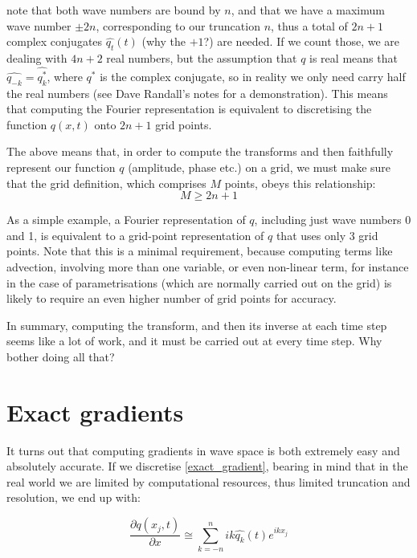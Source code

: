 note that both wave numbers are bound by $n$, and that we have a maximum wave number $\pm 2n$, corresponding to our truncation $n$, thus a total of $2n+1$ complex conjugates $\widehat{q_t}(t)$ (why the $+1$?) are needed. If we count those, we are dealing with $4n+2$ real numbers, but the assumption that $q$ is real means that $\widehat{q_{-k}}=\widehat{q_k^*}$, where $q^*$ is the complex conjugate, so in reality we only need carry half the real numbers (see Dave Randall's notes for a demonstration). This means that computing the Fourier representation is equivalent to discretising the function $q(x,t)$ onto $2n+1$ grid points.

\begin{definition}
The above means that, in order to compute the transforms and then faithfully represent our function $q$ (amplitude, phase etc.) on a grid, we must make sure that the grid definition, which comprises $M$ points, obeys this relationship:
\begin{equation}
	M \ge 2n+1
\end{equation}
\end{definition}

As a simple example, a Fourier representation of $q$, including just wave numbers 0 and 1, is equivalent to a grid-point representation of $q$ that uses only 3 grid points. Note that this is a minimal requirement, because computing terms like advection, involving more than one variable, or even non-linear term, for instance in the case of parametrisations (which are normally carried out on the grid) is likely to require an even higher number of grid points for accuracy.

In summary, computing the transform, and then its inverse at each time step seems like a lot of work, and it must be carried out at every time step. Why bother doing all that?

\section{Exact gradients}
It turns out that computing gradients in wave space is both extremely easy and absolutely accurate. If we discretise \ref{exact_gradient}, bearing in mind that in the real world we are limited by computational resources, thus limited truncation and resolution, we end up with:

\begin{equation}
	\frac{\partial	q(x_j,t)} {\partial x} \cong  \sum_{k=-n}^{n}  ik \widehat{q_k}(t)e^{ikx_j}
	\label{gradient_truncated}
\end{equation}

